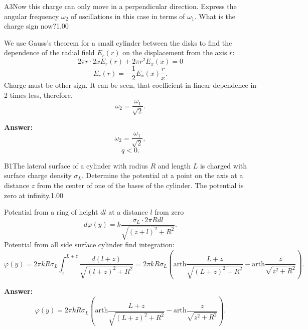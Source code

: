 \documentclass[11pt,a4paper]{article}
\begin{document}
\begin{solcard}{A3}{Now this charge can only move in a perpendicular direction. Express the angular frequency $\omega_2$ of oscillations in this case in terms of $\omega_1$. What is the charge sign now?}{1.00}

We use Gauss's theorem for a small cylinder between the disks to find the dependence of the radial field $E_r(r)$ on the displacement from the axis $r$: $$2\pi r \cdot 2x E_r(r) + 2\pi r^2 E_x(x) = 0$$ $$E_r(r)=-\frac{1}{2}E_x(x)\frac{r}{x}.$$ Charge must be other sign. It can be seen, that coefficient in linear dependence in 2 times less, therefore, $$\omega_2 = \frac{\omega_1}{\sqrt{2}}.$$

\par\smallskip\noindent\textbf{Answer:} $$\omega_2 = \frac{\omega_1}{\sqrt{2}},$$ $$q<0.$$
\end{solcard}

\begin{solcard}{B1}{The lateral surface of a cylinder with radius $R$ and length $L$ is charged with surface charge density $\sigma_L$. Determine the potential at a point on the axis at a distance $z$ from the center of one of the bases of the cylinder. The potential is zero at infinity.}{1.00}

Potential from a ring of height $dl$ at a distance $l$ from zero $$d \varphi (y) = k \frac{\sigma_L \cdot 2 \pi R dl}{\sqrt{(z+l)^2 + R^2}}.$$ Potential from all side surface cylinder find integration: $$\varphi (y) = 2 \pi k R \sigma_L  \int^{L+z}_z \frac{d (l+z)}{\sqrt{(l+z)^2 + R^2}} = 2\pi k R\sigma_L \left( \mathrm{arth} \frac{L+z}{\sqrt{(L+z)^2 + R^2}} - \mathrm{arth} \frac{z}{\sqrt{z^2 + R^2}}\right).$$

\par\smallskip\noindent\textbf{Answer:} $$\varphi (y) = 2\pi k R \sigma_L \left( \mathrm{arth} \frac{L+z}{\sqrt{(L+z)^2 + R^2}} - \mathrm{arth} \frac{z}{\sqrt{z^2 + R^2}}\right).$$
\end{solcard}
\end{document}

